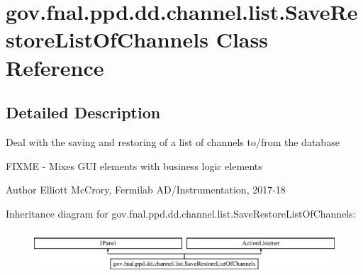 \hypertarget{classgov_1_1fnal_1_1ppd_1_1dd_1_1channel_1_1list_1_1SaveRestoreListOfChannels}{\section{gov.\-fnal.\-ppd.\-dd.\-channel.\-list.\-Save\-Restore\-List\-Of\-Channels Class Reference}
\label{classgov_1_1fnal_1_1ppd_1_1dd_1_1channel_1_1list_1_1SaveRestoreListOfChannels}
}


\subsection{Detailed Description}
Deal with the saving and restoring of a list of channels to/from the database

F\-I\-X\-M\-E -\/ Mixes G\-U\-I elements with business logic elements

\begin{DoxyAuthor}{Author}
Elliott Mc\-Crory, Fermilab A\-D/\-Instrumentation, 2017-\/18 
\end{DoxyAuthor}
Inheritance diagram for gov.\-fnal.\-ppd.\-dd.\-channel.\-list.\-Save\-Restore\-List\-Of\-Channels\-:\begin{figure}[H]
\begin{center}
\leavevmode
\includegraphics[height=1.651917cm]{classgov_1_1fnal_1_1ppd_1_1dd_1_1channel_1_1list_1_1SaveRestoreListOfChannels}
\end{center}
\end{figure}
